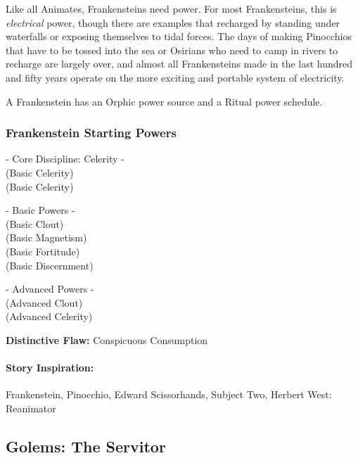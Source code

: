 Like all Animates, Frankensteins need power. For most Frankensteins, this is \textit{electrical} power, though there are examples that recharged by standing under waterfalls or exposing themselves to tidal forces. The days of making Pinocchios that have to be tossed into the sea or Osirians who need to camp in rivers to recharge are largely over, and almost all Frankensteins made in the last hundred and fifty years operate on the more exciting and portable system of electricity.

A Frankenstein has an Orphic power source and a Ritual power schedule.

\subsubsection{Frankenstein Starting Powers}

\hspace{\parindent} - Core Discipline: Celerity -\\
 (Basic Celerity)\\
 (Basic Celerity)

- Basic Powers -\\
 (Basic Clout)\\
 (Basic Magnetism)\\
 (Basic Fortitude)\\
 (Basic Discernment)

- Advanced Powers -\\
 (Advanced Clout)\\
 (Advanced Celerity)

\textbf{Distinctive Flaw:} Conspicuous Consumption

\paragraph{Story Inspiration:} Frankenstein, Pinocchio, Edward Scissorhands, Subject Two, Herbert West: Reanimator

\subsection[Golems]{Golems: The Servitor} 

